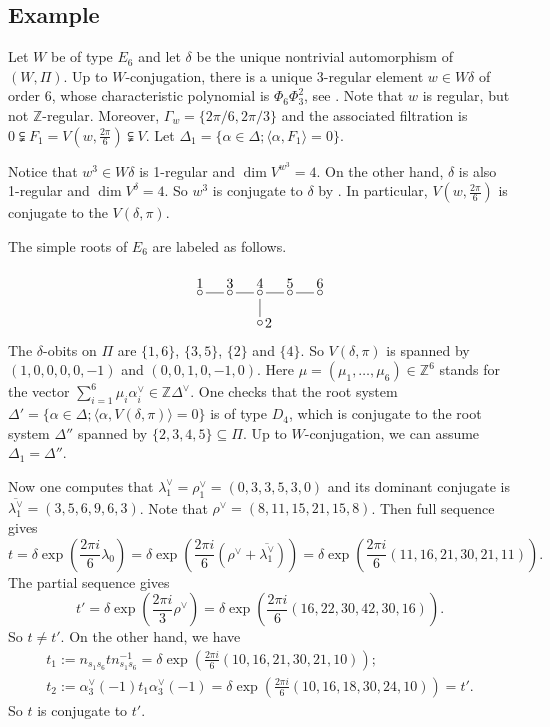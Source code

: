 \documentclass[10pt,leqno]{article}
\renewcommand{\a}{\mathfrak a}
\def\a{\alpha}
\def\G{\Gamma}
\def\d{\delta}
\def\D{\Delta}
\def\l{\lambda}
\begin{document}
\subsection{Example}\label{eg:regular} Let $W$ be of type $E_6$ and let $\d$ be the unique nontrivial automorphism of $(W, \Pi)$. Up to $W$-conjugation, there is a unique 3-regular element $w \in W \d$ of order 6, whose characteristic polynomial is $\Phi_6 \Phi_3^2$, see \cite[Table 8]{springer_regular}. Note that $w$ is regular, but not $\mathbb Z$-regular. Moreover, $\G_w=\{2\pi/6, 2\pi/3\}$ and the associated filtration is $0 \subsetneqq F_1 = V(w,\frac{2\pi}{6}) \subsetneqq V$. Let $\D_1 = \{\a \in \D; \langle\alpha, F_1\rangle = 0\}$.

Notice that $w^3 \in W\d$ is 1-regular and $\dim V^{w^3}=4$. On the other hand, $\d$ is also 1-regular and $\dim V^\d=4$. So $w^3$ is conjugate to $\d$ by \cite[Theorem 6.4 (iv)]{springer_regular}. In particular, $V(w, \frac{2\pi}{6})$ is conjugate to the $V(\d, \pi)$.

The simple roots of $E_6$ are labeled as follows.
\[
\begin{tikzpicture}[baseline = 20, scale=1.5]
\node at (-1,0) {$\circ$};
\node[above] at (-1, 0) {$1$};
\draw (-0.9,0) to (-0.6,0);
\node at (-0.5,0) {$\circ$};
\node[above] at (-0.5, 0) {$3$};
\draw (-0.4,0) to (-0.1,0);
\node at (0,0) {$\circ$};
\node[above] at (0, 0) {$4$};
\draw (0.1,0) to (0.4,0);
\node at (0.5,0) {$\circ$};
\node[above] at (0.5, 0) {$5$};
\draw (0.6,0) to (0.9,0);
\node at (1,0) {$\circ$};
\node[above] at (1, 0) {$6$};
\draw (0,-0.1) to (0,-0.4);
\node at (0,-0.5) {$\circ$};
\node[right] at (0, -0.5) {$2$};
\end{tikzpicture}
\] The $\d$-obits on $\Pi$ are $\{1, 6\}$, $\{3, 5\}$, $\{2\}$ and $\{4\}$. So $V(\d, \pi)$ is spanned by $(1, 0, 0, 0, 0, -1)$ and $(0, 0, 1, 0, -1, 0)$. Here $\mu=(\mu_1, \dots, \mu_6) \in \mathbb Z^6$ stands for the vector $\sum_{i=1}^6 \mu_i \a_i^\vee \in \mathbb Z \D^\vee$. One checks that the root system $\D' = \{\a \in \D; \langle \a, V(\d, \pi)\rangle=0\}$ is of type $D_4$, which is conjugate to the root system $\D''$ spanned by $\{2, 3, 4, 5\} \subseteq \Pi$. Up to $W$-conjugation, we can assume $\D_1 = \D''$.

Now one computes that $\l_1^\vee = \rho_1^\vee=(0, 3, 3, 5, 3, 0)$ and its dominant conjugate is $\overline{\l_1^\vee}=(3, 5, 6, 9, 6, 3)$. Note that $\rho^\vee=(8, 11, 15, 21, 15, 8)$. Then full sequence gives $$t=\d \exp(\frac{2\pi i}{6} \l_0) = \d \exp(\frac{2\pi i}{6} (\rho^\vee + \overline{\l_1^\vee}))=\d \exp(\frac{2\pi i}{6} (11, 16, 21, 30, 21, 11)).$$ The partial sequence gives $$t'= \d \exp(\frac{2\pi i}{3} \rho^\vee)=\d \exp(\frac{2\pi i}{6} (16, 22, 30, 42, 30, 16)).$$ So $t \neq t'$. On the other hand, we have \begin{gather*} t_1:=n_{s_1 s_6} t n_{s_1 s_6}^{-1} = \d \exp(\frac{2\pi i}{6}(10, 16, 21, 30, 21, 10)); \\ t_2:=\a_3^\vee(-1) t_1 \a_3^\vee(-1)=\d \exp(\frac{2\pi i}{6}(10, 16, 18, 30, 24, 10))=t'.\end{gather*} So $t$ is conjugate to $t'$.
\end{document}

